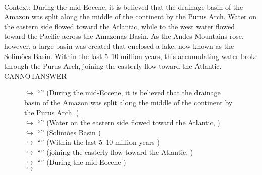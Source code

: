 \documentclass[11pt,a4paper, onecolumn]{article}
\begin{document}
\\ Context: During the mid-Eocene, it is believed that the drainage basin of the Amazon was split along the middle of the continent by the Purus Arch. Water on the eastern side flowed toward the Atlantic, while to the west water flowed toward the Pacific across the Amazonas Basin. As the Andes Mountains rose, however, a large basin was created that enclosed a lake; now known as the Solimões Basin. Within the last 5–10 million years, this accumulating water broke through the Purus Arch, joining the easterly flow toward the Atlantic. CANNOTANSWER

\begin{figure}[t] \small \begin{tcolorbox}[boxsep=0pt,left=5pt,right=0pt,top=2pt,colback = yellow!5] \begin{dialogue}
 \small 
\colorbox{pink!25}{$\hookrightarrow$}
{ ``'' (During the mid-Eocene, it is believed that the drainage basin of the Amazon was split along the middle of the continent by the Purus Arch. ) }
\\
\colorbox{pink!25}{$\hookrightarrow$}
{ ``'' (Water on the eastern side flowed toward the Atlantic, ) }
\\
\colorbox{pink!25}{$\hookrightarrow$}
{ ``'' (Solimões Basin ) }
\\
\colorbox{pink!25}{$\hookrightarrow$}
{ ``'' (Within the last 5–10 million years ) }
\\
\colorbox{pink!25}{$\hookrightarrow$}
{ ``'' (joining the easterly flow toward the Atlantic. ) }
\\
\colorbox{pink!25}{$\hookrightarrow$}
{ ``'' (During the mid-Eocene ) }
\\
\colorbox{pink!25}{$\hookrightarrow$}

\end{dialogue}
\end{tcolorbox}
\end{figure}
\end{document}
